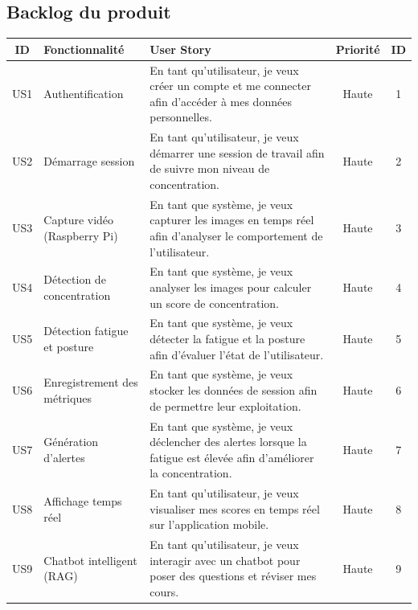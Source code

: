 \subsection{Backlog du produit}
{\singlespacing
\begin{table}[H]
\centering
\small
\renewcommand{\arraystretch}{1.2}
\setlength{\tabcolsep}{5pt}

\begin{tabularx}{\textwidth}{|c|p{3cm}|X|c|c|}
\hline
\textbf{ID} & \textbf{Fonctionnalité} & \textbf{User Story} & \textbf{Priorité} & \textbf{ID} \\
\hline

US1 & Authentification 
& En tant qu’utilisateur, je veux créer un compte et me connecter afin d’accéder à mes données personnelles. 
& Haute & 1 \\ \hline

US2 & Démarrage session 
& En tant qu’utilisateur, je veux démarrer une session de travail afin de suivre mon niveau de concentration. 
& Haute & 2 \\ \hline

US3 & Capture vidéo (Raspberry Pi) 
& En tant que système, je veux capturer les images en temps réel afin d’analyser le comportement de l’utilisateur. 
& Haute & 3 \\ \hline

US4 & Détection de concentration 
& En tant que système, je veux analyser les images pour calculer un score de concentration. 
& Haute & 4 \\ \hline

US5 & Détection fatigue et posture 
& En tant que système, je veux détecter la fatigue et la posture afin d’évaluer l’état de l’utilisateur. 
& Haute & 5 \\ \hline

US6 & Enregistrement des métriques 
& En tant que système, je veux stocker les données de session afin de permettre leur exploitation. 
& Haute & 6 \\ \hline

US7 & Génération d’alertes 
& En tant que système, je veux déclencher des alertes lorsque la fatigue est élevée afin d’améliorer la concentration. 
& Haute & 7 \\ \hline

US8 & Affichage temps réel 
& En tant qu’utilisateur, je veux visualiser mes scores en temps réel sur l’application mobile. 
& Haute & 8 \\ \hline

US9 & Chatbot intelligent (RAG) 
& En tant qu’utilisateur, je veux interagir avec un chatbot pour poser des questions et réviser mes cours. 
& Haute & 9 \\ \hline


\end{tabularx}
\end{table}}
